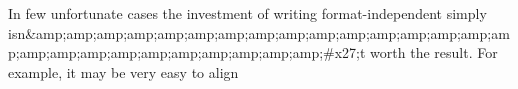 
In few unfortunate cases the investment of writing format-independent \latex simply isn&amp;amp;amp;amp;amp;amp;amp;amp;amp;amp;amp;amp;amp;amp;amp;amp;amp;amp;amp;amp;amp;amp;amp;amp;amp;amp;#x27;t worth the result. For example, it may be very easy to align 